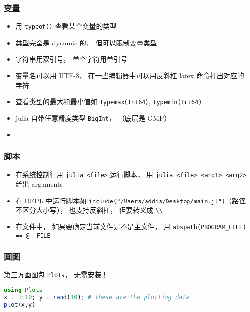 \subsubsection{变量}
\begin{itemize}
\item 用 \verb|typeof()| 查看某个变量的类型
\item 类型完全是 dynamic 的， 但可以限制变量类型
\item 字符串用双引号， 单个字符用单引号
\item 变量名可以用 UTF-8， 在一些编辑器中可以用反斜杠 latex 命令打出对应的字符
\item 查看类型的最大和最小值如 \verb|typemax(Int64)|, \verb|typemin(Int64)|
\item julia 自带任意精度类型 \verb|BigInt|，  （底层是 GMP）
\item 
\end{itemize}

\subsubsection{脚本}
\begin{itemize}
\item 在系统控制行用 \verb|julia <file>| 运行脚本， 用 \verb|julia <file> <arg1> <arg2>| 给出 arguments
\item 在 REPL 中运行脚本如 \verb|include("/Users/addis/Desktop/main.jl")|（路径不区分大小写）， 也支持反斜杠， 但要转义成 \verb|\\|
\item 在文件中， 如果要确定当前文件是不是主文件， 用 \verb|abspath(PROGRAM_FILE) == @__FILE__|
\end{itemize}

\subsubsection{画图}
第三方画图包 \verb|Plots|， 无需安装！
\begin{lstlisting}[language=julia]
using Plots
x = 1:10; y = rand(10); # These are the plotting data
plot(x,y)
\end{lstlisting}
